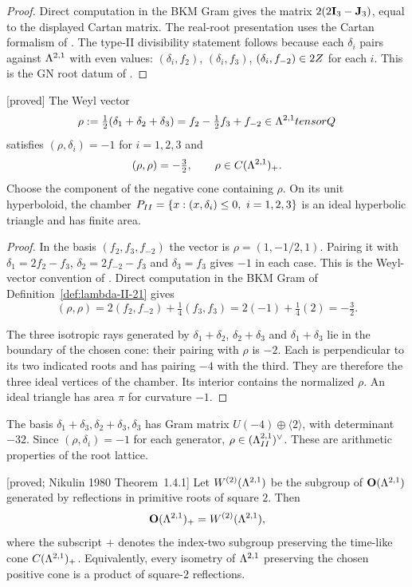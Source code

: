 \begin{proof}
Direct computation in the BKM Gram gives the matrix
$2(2\mathbf{I}_3-\mathbf{J}_3)$, equal to the displayed Cartan matrix.
The real-root presentation uses the Cartan formalism of \cite{KAC:1}.
The type-II divisibility statement follows because each $\delta_i$
pairs against $\Lambda^{2,1}$ with even values: $(\delta_i,f_2)$,
$(\delta_i,f_3)$, $(\delta_i,f_{-2})\in 2Z$ for each $i$.
This is the GN root datum of \cite[Section 5.1.1, case
$(1,II,\overline0)$]{GNII}.
\end{proof}

\begin{proposition}
\label{prop:weyl-vector-II21}
\textnormal{[proved]}
The Weyl vector
\[
\rho:=\tfrac12(\delta_1+\delta_2+\delta_3)
=f_2-\tfrac12 f_3+f_{-2}\in\Lambda^{2,1}tensorQ
\]
satisfies $(\rho,\delta_i)=-1$ for $i=1,2,3$ and
\[
(\rho,\rho)=-\tfrac32,\qquad \rho\in C(\Lambda^{2,1})_+.
\]
Choose the component of the negative cone containing $\rho$.
On its unit hyperboloid, the chamber
$P_{II}=\{x:(x,\delta_i)\le0,\ i=1,2,3\}$ is an ideal
hyperbolic triangle and has finite area.
\end{proposition}

\begin{proof}
In the basis $(f_2,f_3,f_{-2})$ the vector is
$\rho=(1,-1/2,1)$.  Pairing it with
$\delta_1=2f_2-f_3$, $\delta_2=2f_{-2}-f_3$ and $\delta_3=f_3$
gives $-1$ in each case.  This is the Weyl-vector convention of
\cite[(2.7)]{GNII}.  Direct computation in the BKM Gram of
Definition~\ref{def:lambda-II-21} gives
\[
(\rho,\rho)
=2(f_2,f_{-2})+\tfrac14(f_3,f_3)
=2(-1)+\tfrac14(2)=-\tfrac32.
\]

The three isotropic rays generated by
$\delta_1+\delta_2$, $\delta_2+\delta_3$ and
$\delta_1+\delta_3$ lie in the boundary of the chosen cone:
their pairing with $\rho$ is $-2$.
Each is perpendicular to its two indicated roots and has pairing
$-4$ with the third.  They are therefore the three ideal vertices
of the chamber.  Its interior contains the normalized $\rho$.
An ideal triangle has area $\pi$ for curvature $-1$.
\end{proof}

The basis
$\delta_1+\delta_3,\delta_2+\delta_3,\delta_3$
has Gram matrix $U(-4)\oplus\langle2\rangle$, with determinant
$-32$.  Since $(\rho,\delta_i)=-1$ for each generator,
$\rho\in(\Lambda_{II}^{2,1})^\vee$.  These are arithmetic properties
of the root lattice.

\begin{proposition}
\label{prop:nikulin-II21-reflection}
\textnormal{[proved; Nikulin 1980 Theorem~1.4.1]}
Let $W^{(2)}(\Lambda^{2,1})$ be the subgroup of $\mathbf{O}(\Lambda^{2,1})$
generated by reflections in primitive roots of square $2$.  Then
\[
\mathbf{O}(\Lambda^{2,1})_+=W^{(2)}(\Lambda^{2,1}),
\]
where the subscript $+$ denotes the index-two subgroup preserving the
time-like cone $C(\Lambda^{2,1})_+$.  Equivalently, every isometry of
$\Lambda^{2,1}$ preserving the chosen positive cone is a product of
square-$2$ reflections.
\end{proposition}

